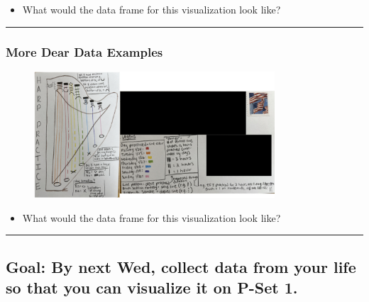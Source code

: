 \documentclass[
  letterpaper,
  DIV=11,
  numbers=noendperiod]{scrartcl}
\providecommand{\tightlist}{%
  \setlength{\itemsep}{0pt}\setlength{\parskip}{0pt}}\usepackage{longtable,booktabs,array}
\begin{document}
\begin{itemize}
\tightlist
\item
  What would the data frame for this visualization look like?
\end{itemize}

\begin{center}\rule{0.5\linewidth}{0.5pt}\end{center}

\hypertarget{more-dear-data-examples-2}{%
\subsubsection{More Dear Data
Examples}\label{more-dear-data-examples-2}}

\begin{figure}

{\centering \includegraphics[width=0.8\textwidth,height=\textheight]{img/postcards_stat100s22.002.jpeg}

}

\end{figure}

\begin{itemize}
\tightlist
\item
  What would the data frame for this visualization look like?
\end{itemize}

\begin{center}\rule{0.5\linewidth}{0.5pt}\end{center}

\hypertarget{goal-by-next-wed-collect-data-from-your-life-so-that-you-can-visualize-it-on-p-set-1.}{%
\subsection{Goal: By next Wed, collect data from your life so that you
can visualize it on P-Set
1.}\label{goal-by-next-wed-collect-data-from-your-life-so-that-you-can-visualize-it-on-p-set-1.}}
\end{document}
